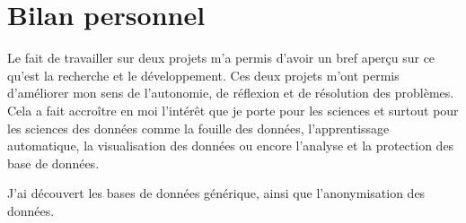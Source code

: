\section{Bilan personnel}
Le fait de travailler sur deux projets m'a permis d'avoir un bref aperçu sur ce qu'est la recherche et le développement. Ces deux projets m'ont permis d'améliorer mon sens de l’autonomie,  de réflexion et de résolution des problèmes. Cela  a fait accroître en moi l'intérêt que je porte pour les sciences et surtout pour les sciences des données comme la fouille des données, l'apprentissage automatique, la visualisation des données ou encore l'analyse et la protection des base de données.

J'ai découvert les bases de données générique, ainsi que l'anonymisation des données.

